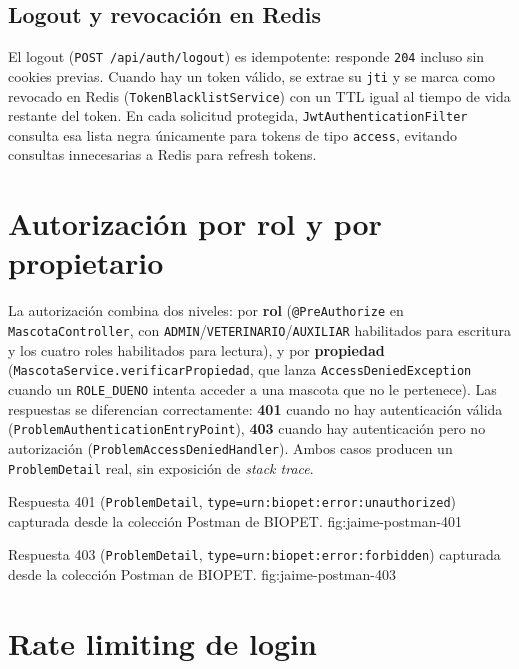 \subsection{Logout y revocaci\'on en Redis}

El logout (\texttt{POST /api/auth/logout}) es idempotente: responde
\texttt{204} incluso sin cookies previas. Cuando hay un token v\'alido, se
extrae su \texttt{jti} y se marca como revocado en Redis
(\texttt{TokenBlacklistService}) con un TTL igual al tiempo de vida
restante del token. En cada solicitud protegida,
\texttt{JwtAuthenticationFilter} consulta esa lista negra \'unicamente para
tokens de tipo \texttt{access}, evitando consultas innecesarias a Redis
para refresh tokens.

\section{Autorizaci\'on por rol y por propietario}

La autorizaci\'on combina dos niveles: por \textbf{rol}
(\texttt{@PreAuthorize} en \texttt{MascotaController}, con
\texttt{ADMIN}/\texttt{VETERINARIO}/\texttt{AUXILIAR} habilitados para
escritura y los cuatro roles habilitados para lectura), y por
\textbf{propiedad} (\texttt{MascotaService.verificarPropiedad}, que lanza
\texttt{AccessDeniedException} cuando un \texttt{ROLE_DUENO} intenta
acceder a una mascota que no le pertenece). Las respuestas se diferencian
correctamente: \textbf{401} cuando no hay autenticaci\'on v\'alida
(\texttt{ProblemAuthenticationEntryPoint}), \textbf{403} cuando hay
autenticaci\'on pero no autorizaci\'on (\texttt{ProblemAccessDeniedHandler}).
Ambos casos producen un \texttt{ProblemDetail} real, sin exposici\'on de
\emph{stack trace}.

%
{Respuesta 401 (\texttt{ProblemDetail}, \texttt{type=urn:biopet:error:unauthorized}) capturada desde la colecci\'on Postman de BIOPET.}%
{fig:jaime-postman-401}

%
{Respuesta 403 (\texttt{ProblemDetail}, \texttt{type=urn:biopet:error:forbidden}) capturada desde la colecci\'on Postman de BIOPET.}%
{fig:jaime-postman-403}

\section{Rate limiting de login}

